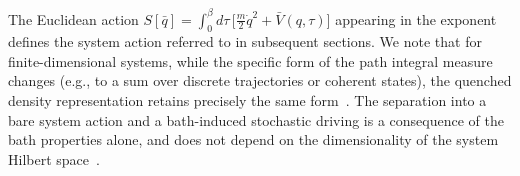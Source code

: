 The Euclidean action $S[\bar q]=\int_0^\beta d\tau\,\big[\frac{m}{2}\dot q^2+\bar V(q,\tau)\big]$
appearing in the exponent defines the system action referred to in subsequent
sections. We note that for finite-dimensional systems, while the specific form of the path integral measure changes (e.g., to a sum over discrete trajectories or coherent states), the quenched density representation retains precisely the same form~\cite{weissQuantumDissipativeSystems2012, altlandCondensedMatterField2010}. The separation into a bare system action and a bath-induced stochastic driving is a consequence of the bath properties alone, and does not depend on the dimensionality of the system Hilbert space~\cite{leggettDynamicsDissipativeTwostate1987}.
